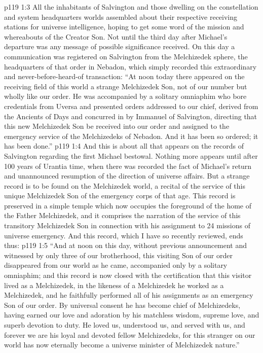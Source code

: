 \vs p119 1:3 All the inhabitants of Salvington and those dwelling on the constellation and system headquarters worlds assembled about their respective receiving stations for universe intelligence, hoping to get some word of the mission and whereabouts of the Creator Son. Not until the third day after Michael’s departure was any message of possible significance received. On this day a communication was registered on Salvington from the Melchizedek sphere, the headquarters of that order in Nebadon, which simply recorded this extraordinary and never\hyp{}before\hyp{}heard\hyp{}of transaction: “At noon today there appeared on the receiving field of this world a strange Melchizedek Son, not of our number but wholly like our order. He was accompanied by a solitary omniaphim who bore credentials from Uversa and presented orders addressed to our chief, derived from the Ancients of Days and concurred in by Immanuel of Salvington, directing that this new Melchizedek Son be received into our order and assigned to the emergency service of the Melchizedeks of Nebadon. And it has been so ordered; it has been done.”
\vs p119 1:4 And this is about all that appears on the records of Salvington regarding the first Michael bestowal. Nothing more appears until after 100 years of Urantia time, when there was recorded the fact of Michael’s return and unannounced resumption of the direction of universe affairs. But a strange record is to be found on the Melchizedek world, a recital of the service of this unique Melchizedek Son of the emergency corps of that age. This record is preserved in a simple temple which now occupies the foreground of the home of the Father Melchizedek, and it comprises the narration of the service of this transitory Melchizedek Son in connection with his assignment to 24 missions of universe emergency. And this record, which I have so recently reviewed, ends thus:
\vs p119 1:5 “And at noon on this day, without previous announcement and witnessed by only three of our brotherhood, this visiting Son of our order disappeared from our world as he came, accompanied only by a solitary omniaphim; and this record is now closed with the certification that this visitor lived as a Melchizedek, in the likeness of a Melchizedek he worked as a Melchizedek, and he faithfully performed all of his assignments as an emergency Son of our order. By universal consent he has become chief of Melchizedeks, having earned our love and adoration by his matchless wisdom, supreme love, and superb devotion to duty. He loved us, understood us, and served with us, and forever we are his loyal and devoted fellow Melchizedeks, for this stranger on our world has now eternally become a universe minister of Melchizedek nature.”
